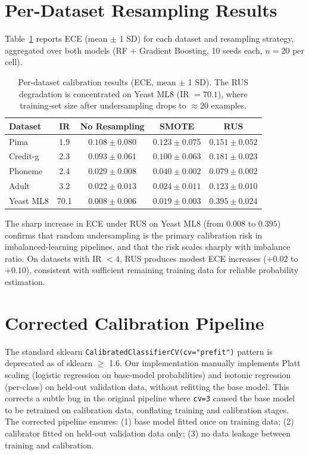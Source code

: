 \documentclass[11pt]{article}
\begin{document}
\section{Per-Dataset Resampling Results}
\label{app:per_dataset}

Table~\ref{tab:per_dataset} reports ECE (mean $\pm$ 1 SD) for each dataset and resampling strategy, aggregated over both models (RF + Gradient Boosting, 10 seeds each, $n=20$ per cell).

\begin{table}[t]
\centering
\caption{Per-dataset calibration results (ECE, mean $\pm$ 1 SD). The RUS degradation is concentrated on Yeast ML8 (IR $=70.1$), where training-set size after undersampling drops to $\approx 20$ examples.}
\label{tab:per_dataset}
\footnotesize
\begin{tabular}{@{}lcccc@{}}
\toprule
\textbf{Dataset} & \textbf{IR} & \textbf{No Resampling} & \textbf{SMOTE} & \textbf{RUS} \\
\midrule
Pima      & 1.9  & $0.108 \pm 0.080$ & $0.123 \pm 0.075$ & $0.151 \pm 0.052$ \\
Credit-g  & 2.3  & $0.093 \pm 0.061$ & $0.100 \pm 0.063$ & $0.181 \pm 0.023$ \\
Phoneme   & 2.4  & $0.029 \pm 0.008$ & $0.040 \pm 0.002$ & $0.079 \pm 0.002$ \\
Adult     & 3.2  & $0.022 \pm 0.013$ & $0.024 \pm 0.011$ & $0.123 \pm 0.010$ \\
Yeast ML8 & 70.1 & $0.008 \pm 0.006$ & $0.019 \pm 0.003$ & $\mathbf{0.395 \pm 0.024}$ \\
\bottomrule
\end{tabular}
\end{table}

The sharp increase in ECE under RUS on Yeast ML8 (from $0.008$ to $0.395$) confirms that random undersampling is the primary calibration risk in imbalanced-learning pipelines, and that the risk scales sharply with imbalance ratio. On datasets with IR $< 4$, RUS produces modest ECE increases ($+0.02$ to $+0.10$), consistent with sufficient remaining training data for reliable probability estimation.

\section{Corrected Calibration Pipeline}

The standard sklearn \texttt{CalibratedClassifierCV(cv="prefit")} pattern is deprecated as of sklearn $\ge$ 1.6. Our implementation manually implements Platt scaling (logistic regression on base-model probabilities) and isotonic regression (per-class) on held-out validation data, without refitting the base model. This corrects a subtle bug in the original pipeline where \texttt{cv=3} caused the base model to be retrained on calibration data, conflating training and calibration stages. The corrected pipeline ensures: (1) base model fitted once on training data; (2) calibrator fitted on held-out validation data only; (3) no data leakage between training and calibration.
\end{document}
